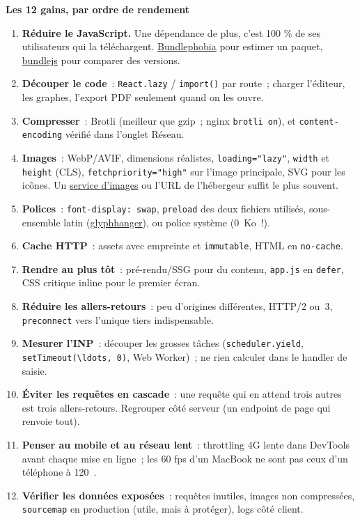 \documentclass[12pt,a4paper,twoside,openright]{book}
\newcommand{\link}[2]{\href{#2}{#1}}
\newcommand{\etape}[1]{\par\medskip\noindent\textbf{\large #1}\par\smallskip}
\begin{document}
\etape{Les 12 gains, par ordre de rendement}
\begin{enumerate}
  \item \textbf{R\'eduire le JavaScript.} Une d\'ependance de plus, c'est 100 \% de ses utilisateurs
        qui la t\'el\'echargent. \link{Bundlephobia}{https://bundlephobia.com/} pour estimer un paquet,
        \link{bundlejs}{https://bundlejs.com/} pour comparer des versions.
  \item \textbf{D\'ecouper le code}~: \verb|React.lazy| / \verb|import()| par route~; charger
        l'\'editeur, les graphes, l'export PDF seulement quand on les ouvre.
  \item \textbf{Compresser}~: Brotli (meilleur que gzip~; nginx \verb|brotli on|),
        et \verb|content-encoding| v\'erifi\'e dans l'onglet R\'eseau.
  \item \textbf{Images}~: WebP/AVIF, dimensions r\'ealistes, \verb|loading="lazy"|, \verb|width| et
        \verb|height| (CLS), \verb|fetchpriority="high"| sur l'image principale,
        SVG pour les ic\^ones. Un \link{service d'images}{https://imgproxy.net/} ou l'URL de
        l'h\'ebergeur suffit le plus souvent.
  \item \textbf{Polices}~: \verb|font-display: swap|, \verb|preload| des deux fichiers utilis\'es,
        sous-ensemble latin (\link{glyphhanger}{https://github.com/zachleat/glyphhanger}),
        ou police syst\`eme (0~Ko~!).
  \item \textbf{Cache HTTP}~: assets avec empreinte et \verb|immutable|, HTML en \verb|no-cache|.
  \item \textbf{Rendre au plus t\^ot}~: pr\'e-rendu/SSG pour du contenu, \verb|app.js| en \verb|defer|,
        CSS critique inline pour le premier \'ecran.
  \item \textbf{R\'eduire les allers-retours}~: peu d'origines diff\'erentes, HTTP/2 ou~3,
        \verb|preconnect| vers l'unique tiers indispensable.
  \item \textbf{Mesurer l'INP}~: d\'ecouper les grosses t\^aches (\verb|scheduler.yield|,
        \verb|setTimeout(\ldots, 0)|, Web Worker)~; ne rien calculer dans le handler de saisie.
  \item \textbf{\'Eviter les requ\^etes en cascade}~: une requ\^ete qui en attend trois autres est
        trois allers-retours. Regrouper c\^ot\'e serveur (un endpoint de page qui renvoie tout).
  \item \textbf{Penser au mobile et au r\'eseau lent}~: throttling 4G lente dans DevTools avant
        chaque mise en ligne~; les 60 fps d'un MacBook ne sont pas ceux d'un t\'el\'ephone \`a 120~\texteuro{}.
  \item \textbf{V\'erifier les donn\'ees expos\'ees}~: requ\^etes inutiles, images non compress\'ees,
        \verb|sourcemap| en production (utile, mais \`a prot\'eger), logs c\^ot\'e client.
\end{enumerate}
\end{document}
